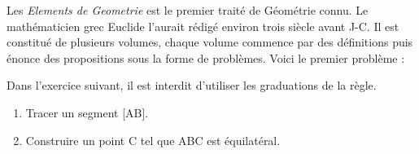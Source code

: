 \documentclass[exercice]{thedocument}%
\begin{document}
%
Les {\itshape Elements de Geometrie} est le premier traité de Géométrie connu.
Le mathématicien grec Euclide l'aurait rédigé environ trois siècle avant J-C.
Il est constitué de plusieurs volumes, chaque volume commence par des
définitions puis énonce des propositions sous la forme de problèmes.
\vskip10pt Voici le premier problème :\vskip15pt
{\par}
\vskip15pt Dans l'exercice suivant, il est interdit d'utiliser les graduations
de la règle.\vskip30pt
\begin{enumerate}
    \item Tracer un segment [AB].
    \item Construire un point C tel que ABC est équilatéral.
\end{enumerate}
\end{document}
